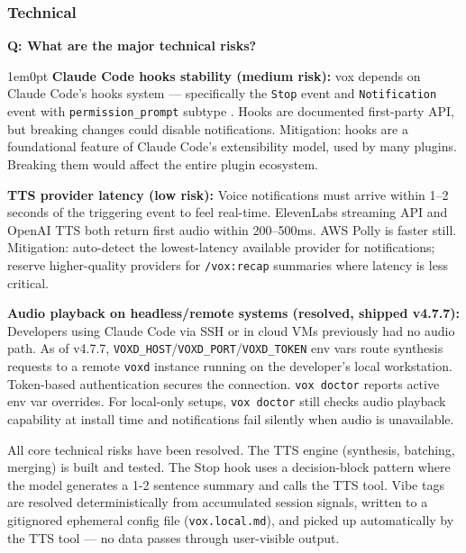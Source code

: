 \documentclass[11pt,letterpaper]{article}
\newcounter{faqnum}
\newenvironment{faqpair}[1]{%
  \needspace{4\baselineskip}%
  \vspace{0.5em}%
  \refstepcounter{faqnum}%
  \noindent\textbf{\color{SectionBlue}Q\thefaqnum: #1}\par\nopagebreak[4]%
  \vspace{0.2em}%
  \begin{adjustwidth}{1em}{0pt}%
  \setlength{\parindent}{0pt}%
}{%
  \end{adjustwidth}%
  \vspace{0.5em}%
}
\begin{document}
\subsubsection*{Technical}

\begin{faqpair}{What are the major technical risks?}\label{faq:tech-risks}
  \textbf{Claude Code hooks stability (medium risk):} vox depends on
  Claude Code's hooks system --- specifically the \texttt{Stop} event and
  \texttt{Notification} event with \texttt{permission\_prompt} subtype
  \cite{claudecodehooks2026}. Hooks are documented first-party API, but
  breaking changes could disable notifications. Mitigation: hooks are a
  foundational feature of Claude Code's extensibility model, used by many
  plugins. Breaking them would affect the entire plugin ecosystem.

  \textbf{TTS provider latency (low risk):} Voice notifications must arrive
  within 1--2 seconds of the triggering event to feel real-time. ElevenLabs
  streaming API and OpenAI TTS both return first audio within 200--500ms.
  AWS Polly is faster still. Mitigation: auto-detect the lowest-latency
  available provider for notifications; reserve higher-quality providers for
  \texttt{/vox:recap} summaries where latency is less critical.

  \textbf{Audio playback on headless/remote systems (resolved, shipped
  v4.7.7):} Developers using Claude Code via SSH or in cloud VMs previously
  had no audio path. As of v4.7.7, \texttt{VOXD\_HOST}/\allowbreak\texttt{VOXD\_PORT}/\allowbreak\texttt{VOXD\_TOKEN}
  env vars route synthesis requests to a remote \texttt{voxd} instance
  running on the developer's local workstation. Token-based authentication
  secures the connection. \texttt{vox doctor} reports active env var
  overrides. For local-only setups, \texttt{vox doctor} still checks audio
  playback capability at install time and notifications fail silently when
  audio is unavailable.

  All core technical risks have been resolved. The TTS engine (synthesis,
  batching, merging) is built and tested. The Stop hook uses a decision-block
  pattern where the model generates a 1-2 sentence summary and calls the TTS
  tool. Vibe tags are resolved deterministically from accumulated session
  signals, written to a gitignored ephemeral config file
  (\texttt{vox.local.md}), and picked up automatically by the TTS tool ---
  no data passes through user-visible output.
\end{faqpair}
\end{document}
